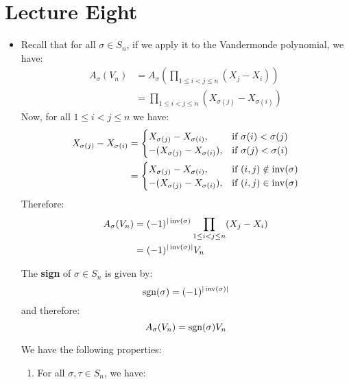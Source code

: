 \section{Lecture Eight}
\begin{itemize}
    \item Recall that for all $\sigma \in S_n$, if we apply it to the Vandermonde polynomial, we have:
    \begin{align}
        A_\sigma (V_n) &= A_\sigma \left(\prod_{1\le i < j \le n} (X_j-X_i) \right) \\ 
        &= \prod_{1\le i < j\le n} \left(X_{\sigma(j)}-X_{\sigma(i)}\right)
    \end{align}
    Now, for all $1\le i < j \le n$ we have:
    \begin{align}
        X_{\sigma(j)}-X_{\sigma(i)} &= \begin{cases}
            X_{\sigma(j)}-X_{\sigma(i)} ,& \text{if } \sigma(i)<\sigma(j) \\ 
            -(X_{\sigma(j)}-X_{\sigma(i)}) ,& \text{if } \sigma(j)<\sigma(i)
        \end{cases} \\ 
        &=\begin{cases}
            X_{\sigma(j)}-X_{\sigma(i)} ,& \text{if } (i,j) \notin \operatorname{inv}(\sigma) \\ 
            -(X_{\sigma(j)}-X_{\sigma(i)}) ,& \text{if } (i,j) \in \operatorname{inv}(\sigma)
        \end{cases}
    \end{align}
    Therefore:
    \begin{align}
        A_\sigma (V_n) &= (-1)^{|\operatorname{inv}(\sigma)} \prod_{1\le i < j \le n}(X_j-X_i) \\ 
        &= (-1)^{|\operatorname{inv}(\sigma)|}V_n
    \end{align}
    \begin{definition}
        The \textbf{sign} of $\sigma \in S_n$ is given by:
        \begin{equation}
            \operatorname{sgn}(\sigma) = (-1)^{|\operatorname{inv}(\sigma)|}
        \end{equation}
        and therefore:
        \begin{equation}
            A_\sigma(V_n) = \operatorname{sgn}(\sigma)V_n
        \end{equation}
    \end{definition}
    \begin{lemma}
        We have the following properties:
        \begin{enumerate}
            \item For all $\sigma,\tau \in S_n$, we have:

\end{enumerate}
\end{lemma}
\end{itemize}
